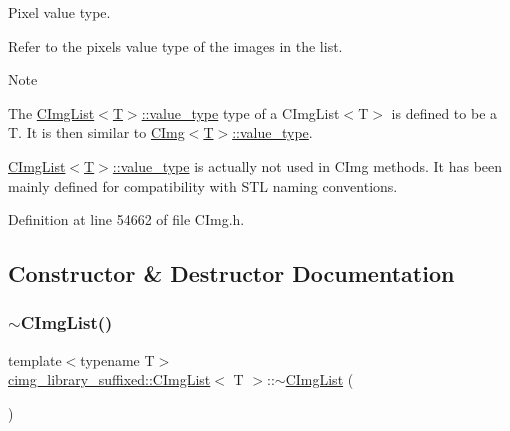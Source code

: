 Pixel value type. 

Refer to the pixels value type of the images in the list. \begin{DoxyNote}{Note}

\begin{DoxyItemize}
\item The {\ttfamily \hyperlink{structcimg__library__suffixed_1_1CImgList_a41c952483793b049e58c27e11d0dd955}{C\+Img\+List$<$\+T$>$\+::value\+\_\+type}} type of a {\ttfamily C\+Img\+List$<$\+T$>$} is defined to be a {\ttfamily T}. It is then similar to \hyperlink{structcimg__library__suffixed_1_1CImg_a9a18781e1d4ca73670e52bc4a56ec3d2}{C\+Img$<$\+T$>$\+::value\+\_\+type}.
\item {\ttfamily \hyperlink{structcimg__library__suffixed_1_1CImgList_a41c952483793b049e58c27e11d0dd955}{C\+Img\+List$<$\+T$>$\+::value\+\_\+type}} is actually not used in C\+Img methods. It has been mainly defined for compatibility with S\+TL naming conventions. 
\end{DoxyItemize}
\end{DoxyNote}


Definition at line 54662 of file C\+Img.\+h.



\subsection{Constructor \& Destructor Documentation}
\mbox{\label{structcimg__library__suffixed_1_1CImgList_a8f847fd81ab71a71dadf11db36f49dd3}} 
\subsubsection{\texorpdfstring{$\sim$\+C\+Img\+List()}{~CImgList()}}
{\footnotesize\ttfamily template$<$typename T$>$ \\
\hyperlink{structcimg__library__suffixed_1_1CImgList}{cimg\+\_\+library\+\_\+suffixed\+::\+C\+Img\+List}$<$ T $>$\+::$\sim$\hyperlink{structcimg__library__suffixed_1_1CImgList}{C\+Img\+List} (\begin{DoxyParamCaption}{ }\end{DoxyParamCaption})\hspace{0.3cm}{\ttfamily [inline]}}



